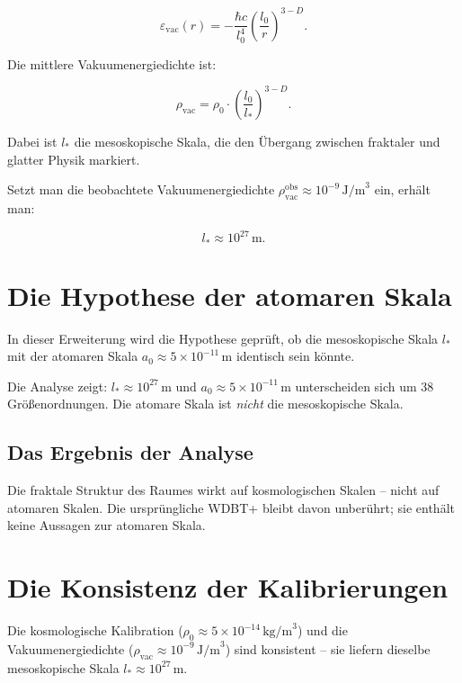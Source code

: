 \begin{equation}
\varepsilon_{\text{vac}}(r) = -\frac{\hbar c}{l_0^4} \left( \frac{l_0}{r} \right)^{3-D}. \tag{8.4}
\end{equation}

Die mittlere Vakuumenergiedichte ist:

\begin{equation}
\rho_{\text{vac}} = \rho_0 \cdot \left( \frac{l_0}{l_*} \right)^{3-D}. \tag{8.5}
\end{equation}

Dabei ist \( l_* \) die mesoskopische Skala, die den Übergang zwischen fraktaler und glatter Physik markiert.

Setzt man die beobachtete Vakuumenergiedichte \( \rho_{\text{vac}}^{\text{obs}} \approx 10^{-9} \, \text{J/m}^3 \) ein, erhält man:

\begin{equation}
l_* \approx 10^{27} \, \text{m}. \tag{8.6}
\end{equation}

\section{Die Hypothese der atomaren Skala}

In dieser Erweiterung wird die Hypothese geprüft, ob die mesoskopische Skala \( l_* \) mit der atomaren Skala \( a_0 \approx 5 \times 10^{-11} \, \text{m} \)
identisch sein könnte.

Die Analyse zeigt: \( l_* \approx 10^{27} \, \text{m} \) und \( a_0 \approx 5 \times 10^{-11} \, \text{m} \) unterscheiden sich um 38 Größenordnungen. Die atomare
Skala ist \emph{nicht} die mesoskopische Skala.

\subsection{Das Ergebnis der Analyse}

Die fraktale Struktur des Raumes wirkt auf kosmologischen Skalen – nicht auf atomaren Skalen. Die ursprüngliche WDBT+ bleibt davon unberührt; sie enthält keine
Aussagen zur atomaren Skala.

\section{Die Konsistenz der Kalibrierungen}

Die kosmologische Kalibration (\( \rho_0 \approx 5 \times 10^{-14} \, \text{kg/m}^3 \)) und die Vakuumenergiedichte
(\( \rho_{\text{vac}} \approx 10^{-9} \, \text{J/m}^3 \)) sind konsistent – sie liefern dieselbe mesoskopische Skala \( l_* \approx 10^{27} \, \text{m} \).

